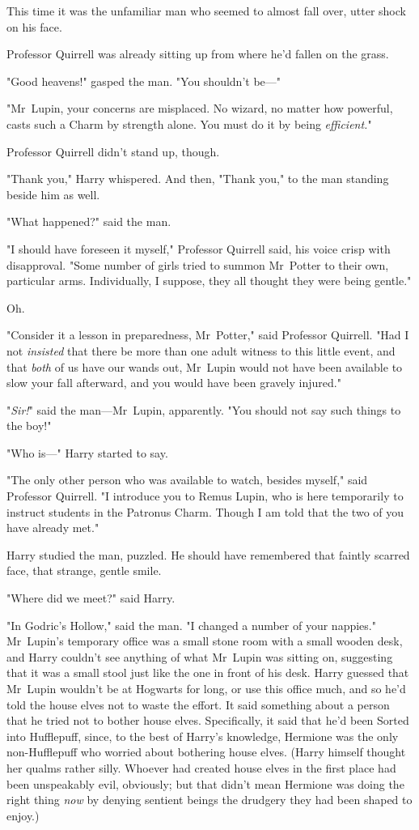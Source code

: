 This time it was the unfamiliar man who seemed to almost fall over, utter shock
on his face.

Professor Quirrell was already sitting up from where he'd fallen on the grass.

"Good heavens!" gasped the man. "You shouldn't be---"

"Mr~Lupin, your concerns are misplaced. No wizard, no matter how powerful,
casts such a Charm by strength alone. You must do it by being \emph{efficient.}"

Professor Quirrell didn't stand up, though.

"Thank you," Harry whispered. And then, "Thank you," to the man standing beside
him as well.

"What happened?" said the man.

"I should have foreseen it myself," Professor Quirrell said, his voice crisp
with disapproval. "Some number of girls tried to summon Mr~Potter to their
own, particular arms. Individually, I suppose, they all thought they were being
gentle."

Oh.

"Consider it a lesson in preparedness, Mr~Potter," said Professor Quirrell.
"Had I not \emph{insisted} that there be more than one adult witness to this
little event, and that \emph{both} of us have our wands out, Mr~Lupin would
not have been available to slow your fall afterward, and you would have been
gravely injured."

"\emph{Sir!}" said the man---Mr~Lupin, apparently. "You should not say such
things to the boy!"

"Who is---" Harry started to say.

"The only other person who was available to watch, besides myself," said
Professor Quirrell. "I introduce you to Remus Lupin, who is here temporarily to
instruct students in the Patronus Charm. Though I am told that the two of you
have already met."

Harry studied the man, puzzled. He should have remembered that faintly scarred
face, that strange, gentle smile.

"Where did we meet?" said Harry.

"In Godric's Hollow," said the man. "I changed a number of your nappies."
\later
Mr~Lupin's temporary office was a small stone room with a small wooden desk,
and Harry couldn't see anything of what Mr~Lupin was sitting on, suggesting
that it was a small stool just like the one in front of his desk. Harry guessed
that Mr~Lupin wouldn't be at Hogwarts for long, or use this office much, and
so he'd told the house elves not to waste the effort. It said something about a
person that he tried not to bother house elves. Specifically, it said that he'd
been Sorted into Hufflepuff, since, to the best of Harry's knowledge, Hermione
was the only non-Hufflepuff who worried about bothering house elves. (Harry
himself thought her qualms rather silly. Whoever had created house elves in the
first place had been unspeakably evil, obviously; but that didn't mean Hermione
was doing the right thing \emph{now} by denying sentient beings the drudgery
they had been shaped to enjoy.)

